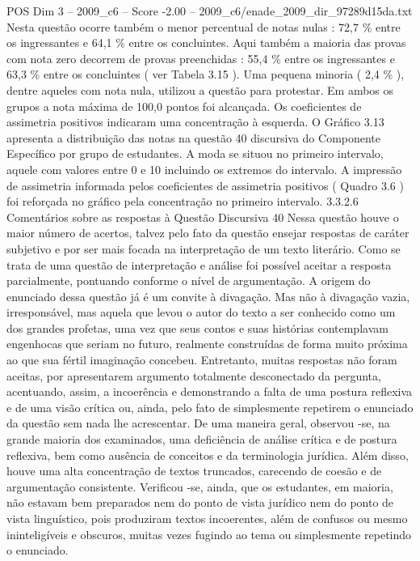 \begin{textsample}{POS Dim 3 – 2009\_c6 – Score -2.00 – 2009\_c6/enade\_2009\_dir\_97289d15da.txt}
Nesta questão ocorre também o menor percentual de notas nulas : 72,7 \% entre os ingressantes e 64,1 \% entre os concluintes.
Aqui também a maioria das provas com nota zero decorrem de provas preenchidas : 55,4 \% entre os ingressantes e 63,3 \% entre os concluintes ( ver Tabela 3.15 ).
Uma pequena minoria ( 2,4 \% ), dentre aqueles com nota nula, utilizou a questão para protestar.
Em ambos os grupos a nota máxima de 100,0 pontos foi alcançada.
Os coeficientes de assimetria positivos indicaram uma concentração à esquerda.
O Gráfico 3.13 apresenta a distribuição das notas na questão 40 discursiva do Componente Específico por grupo de estudantes.
A moda se situou no primeiro intervalo, aquele com valores entre 0 e 10 incluindo os extremos do intervalo.
A impressão de assimetria informada pelos coeficientes de assimetria positivos ( Quadro 3.6 ) foi reforçada no gráfico pela concentração no primeiro intervalo. 3.3.2.6 Comentários sobre as respostas à Questão Discursiva 40 Nessa questão houve o maior número de acertos, talvez pelo fato da questão ensejar respostas de caráter subjetivo e por ser mais focada na interpretação de um texto literário.
Como se trata de uma questão de interpretação e análise foi possível aceitar a resposta parcialmente, pontuando conforme o nível de argumentação.
A origem do enunciado dessa questão já é um convite à divagação.
Mas não à divagação vazia, irresponsável, mas aquela que levou o autor do texto a ser conhecido como um dos grandes profetas, uma vez que seus contos e suas histórias contemplavam engenhocas que seriam no futuro, realmente construídas de forma muito próxima ao que sua fértil imaginação concebeu.
Entretanto, muitas respostas não foram aceitas, por apresentarem argumento totalmente desconectado da pergunta, acentuando, assim, a incoerência e demonstrando a falta de uma postura reflexiva e de uma visão crítica ou, ainda, pelo fato de simplesmente repetirem o enunciado da questão sem nada lhe acrescentar.
De uma maneira geral, observou -se, na grande maioria dos examinados, uma deficiência de análise crítica e de postura reflexiva, bem como ausência de conceitos e da terminologia jurídica.
Além disso, houve uma alta concentração de textos truncados, carecendo de coesão e de argumentação consistente.
Verificou -se, ainda, que os estudantes, em maioria, não estavam bem preparados nem do ponto de vista jurídico nem do ponto de vista linguístico, pois produziram textos incoerentes, além de confusos ou mesmo ininteligíveis e obscuros, muitas vezes fugindo ao tema ou simplesmente repetindo o enunciado.

\end{textsample}

